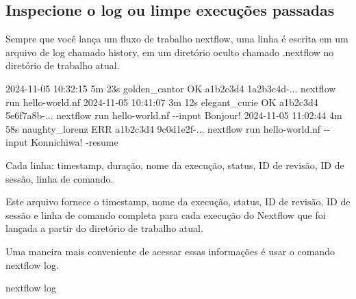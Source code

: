 \documentclass[
  brazilian,
  letterpaper,
  DIV=11,
  numbers=noendperiod]{scrreprt}
\newenvironment{Shaded}{\begin{snugshade}}{\end{snugshade}}
\newcommand{\ExtensionTok}[1]{\textcolor[rgb]{0.00,0.23,0.31}{#1}}
\newcommand{\NormalTok}[1]{\textcolor[rgb]{0.00,0.23,0.31}{#1}}
\begin{document}
\subsection{Inspecione o log ou limpe execuções
passadas}\label{inspecione-o-log-ou-limpe-execuuxe7uxf5es-passadas}

Sempre que você lança um fluxo de trabalho nextflow, uma linha é escrita
em um arquivo de log chamado history, em um diretório oculto chamado
.nextflow no diretório de trabalho atual.

\begin{tcolorbox}[enhanced jigsaw, arc=.35mm, bottomrule=.15mm, bottomtitle=1mm, breakable, colback=white, colbacktitle=quarto-callout-note-color!10!white, colframe=quarto-callout-note-color-frame, coltitle=black, left=2mm, leftrule=.75mm, opacityback=0, opacitybacktitle=0.6, rightrule=.15mm, title=\textcolor{quarto-callout-note-color}{\faInfo}\hspace{0.5em}{Ver exemplo do arquivo \texttt{.nextflow/history}}, titlerule=0mm, toprule=.15mm, toptitle=1mm]

\begin{Shaded}
\begin{Highlighting}[]
\NormalTok{2024{-}11{-}05 10:32:15 5m 23s  golden\_cantor   OK  a1b2c3d4    1a2b3c4d{-}...    nextflow run hello{-}world.nf}
\NormalTok{2024{-}11{-}05 10:41:07 3m 12s  elegant\_curie   OK  a1b2c3d4    5e6f7a8b{-}...    nextflow run hello{-}world.nf {-}{-}input \textquotesingle{}Bonjour!\textquotesingle{}}
\NormalTok{2024{-}11{-}05 11:02:44 4m 58s  naughty\_lorenz  ERR a1b2c3d4    9c0d1e2f{-}...    nextflow run hello{-}world.nf {-}{-}input \textquotesingle{}Konnichiwa!\textquotesingle{} {-}resume}
\end{Highlighting}
\end{Shaded}

Cada linha: timestamp, duração, nome da execução, status, ID de revisão,
ID de sessão, linha de comando.

\end{tcolorbox}

Este arquivo fornece o timestamp, nome da execução, status, ID de
revisão, ID de sessão e linha de comando completa para cada execução do
Nextflow que foi lançada a partir do diretório de trabalho atual.

Uma maneira mais conveniente de acessar essas informações é usar o
comando nextflow log.

\begin{Shaded}
\begin{Highlighting}[]
\ExtensionTok{nextflow}\NormalTok{ log}
\end{Highlighting}
\end{Shaded}
\end{document}
